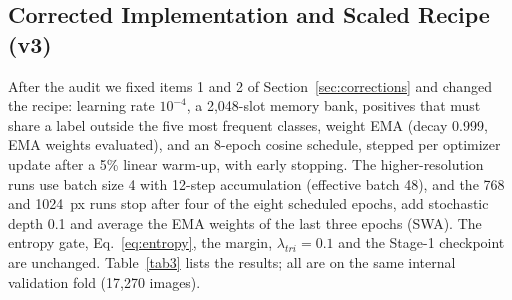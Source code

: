 \documentclass[conference]{IEEEtran}
\begin{document}
\subsection{Corrected Implementation and Scaled Recipe (v3)}
\label{sec:v3}
After the audit we fixed items 1 and 2 of Section~\ref{sec:corrections} and changed the recipe: learning rate $10^{-4}$, a 2,048-slot memory bank, positives that must share a label outside the five most frequent classes, weight EMA (decay 0.999, EMA weights evaluated), and an 8-epoch cosine schedule, stepped per optimizer update after a 5\% linear warm-up, with early stopping. The higher-resolution runs use batch size 4 with 12-step accumulation (effective batch 48), and the 768 and 1024~px runs stop after four of the eight scheduled epochs, add stochastic depth 0.1 and average the EMA weights of the last three epochs (SWA). The entropy gate, Eq.~\ref{eq:entropy}, the margin, $\lambda_{tri}{=}0.1$ and the Stage-1 checkpoint are unchanged. Table~\ref{tab3} lists the results; all are on the same internal validation fold (17,270 images).

\begin{table}[htbp]
\caption{Corrected implementation (v3), internal validation. Single models report the best epoch of the EMA weights or their SWA, without test-time augmentation unless stated. ``Flip'' averages the prediction with that of the horizontally flipped image. The greedy ensemble is a uniform average of three models chosen by forward selection on this validation fold, so it is optimistic; the fixed four-model average has no selection. -- = not computed.}
\begin{center}
\label{tab3}
\end{center}
\end{table}
\end{document}

